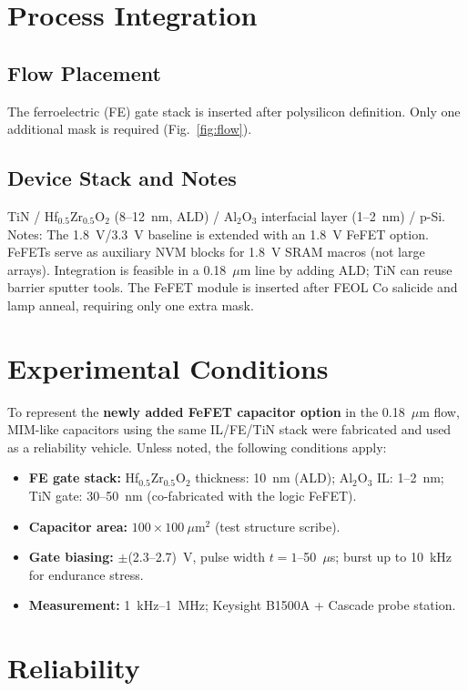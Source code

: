 \documentclass[conference]{IEEEtran}
\begin{document}
\section{Process Integration}

\subsection{Flow Placement}
The ferroelectric (FE) gate stack is inserted after polysilicon definition. Only one additional mask is required (Fig.~\ref{fig:flow}).

\subsection{Device Stack and Notes}
TiN / Hf$_{0.5}$Zr$_{0.5}$O$_2$ (8--12~nm, ALD) / Al$_2$O$_3$ interfacial layer (1--2~nm) / p-Si. Notes: The 1.8~V/3.3~V baseline is extended with an 1.8~V FeFET option. FeFETs serve as auxiliary NVM blocks for 1.8~V SRAM macros (not large arrays). Integration is feasible in a 0.18~$\mu$m line by adding ALD; TiN can reuse barrier sputter tools. The FeFET module is inserted after FEOL Co salicide and lamp anneal, requiring only one extra mask.

\section{Experimental Conditions}
To represent the \textbf{newly added FeFET capacitor option} in the 0.18~$\mu$m flow, MIM-like capacitors using the same IL/FE/TiN stack were fabricated and used as a reliability vehicle. Unless noted, the following conditions apply:
\begin{itemize}
  \item \textbf{FE gate stack:} Hf$_{0.5}$Zr$_{0.5}$O$_2$ thickness: 10~nm (ALD); Al$_2$O$_3$ IL: 1--2~nm; TiN gate: 30--50~nm (co-fabricated with the logic FeFET).
  \item \textbf{Capacitor area:} $100 \times 100~\mu$m$^2$ (test structure scribe).
  \item \textbf{Gate biasing:} $\pm$(2.3--2.7)~V, pulse width $t = 1$--50~$\mu$s; burst up to 10~kHz for endurance stress.
  \item \textbf{Measurement:} 1~kHz--1~MHz; Keysight B1500A + Cascade probe station.
\end{itemize}

\section{Reliability}
\end{document}
